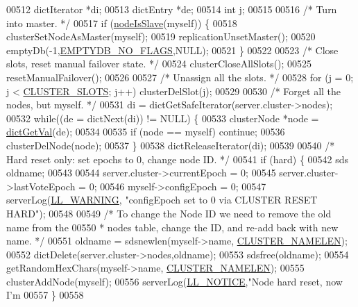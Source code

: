 \begin{DoxyCode}
{{{{{{{{00512     dictIterator *di;
00513     dictEntry *de;
00514     \textcolor{keywordtype}{int} j;
00515 
00516     \textcolor{comment}{/* Turn into master. */}
00517     \textcolor{keywordflow}{if} (\hyperlink{cluster_8h_a3c99881f6892130c902b42b1f84a0e11}{nodeIsSlave}(myself)) \{
00518         clusterSetNodeAsMaster(myself);
00519         replicationUnsetMaster();
00520         emptyDb(-1,\hyperlink{server_8h_a83a0ecde3a9f1f6bbcae9f4b966a509b}{EMPTYDB\_NO\_FLAGS},NULL);
00521     \}
00522 
00523     \textcolor{comment}{/* Close slots, reset manual failover state. */}
00524     clusterCloseAllSlots();
00525     resetManualFailover();
00526 
00527     \textcolor{comment}{/* Unassign all the slots. */}
00528     \textcolor{keywordflow}{for} (j = 0; j < \hyperlink{cluster_8h_aa3e2cb951eebb16725ecc3f5beefd9fd}{CLUSTER\_SLOTS}; j++) clusterDelSlot(j);
00529 
00530     \textcolor{comment}{/* Forget all the nodes, but myself. */}
00531     di = dictGetSafeIterator(server.cluster->nodes);
00532     \textcolor{keywordflow}{while}((de = dictNext(di)) != NULL) \{
00533         clusterNode *node = \hyperlink{dict_8h_ae8d2cc391873b2bea2b87c4f80f43120}{dictGetVal}(de);
00534 
00535         \textcolor{keywordflow}{if} (node == myself) \textcolor{keywordflow}{continue};
00536         clusterDelNode(node);
00537     \}
00538     dictReleaseIterator(di);
00539 
00540     \textcolor{comment}{/* Hard reset only: set epochs to 0, change node ID. */}
00541     \textcolor{keywordflow}{if} (hard) \{
00542         sds oldname;
00543 
00544         server.cluster->currentEpoch = 0;
00545         server.cluster->lastVoteEpoch = 0;
00546         myself->configEpoch = 0;
00547         serverLog(\hyperlink{server_8h_a31229b9334bba7d6be2a72970967a14b}{LL\_WARNING}, \textcolor{stringliteral}{"configEpoch set to 0 via CLUSTER RESET HARD"});
00548 
00549         \textcolor{comment}{/* To change the Node ID we need to remove the old name from the}
00550 \textcolor{comment}{         * nodes table, change the ID, and re-add back with new name. */}
00551         oldname = sdsnewlen(myself->name, \hyperlink{cluster_8h_ace7a882972eff7149675252938643b6e}{CLUSTER\_NAMELEN});
00552         dictDelete(server.cluster->nodes,oldname);
00553         sdsfree(oldname);
00554         getRandomHexChars(myself->name, \hyperlink{cluster_8h_ace7a882972eff7149675252938643b6e}{CLUSTER\_NAMELEN});
00555         clusterAddNode(myself);
00556         serverLog(\hyperlink{server_8h_a8c54c191e436c7dd3012167212692401}{LL\_NOTICE},\textcolor{stringliteral}{"Node hard reset, now I'm %
00557     \}
00558 
}}}}}}}}}
\end{DoxyCode}
